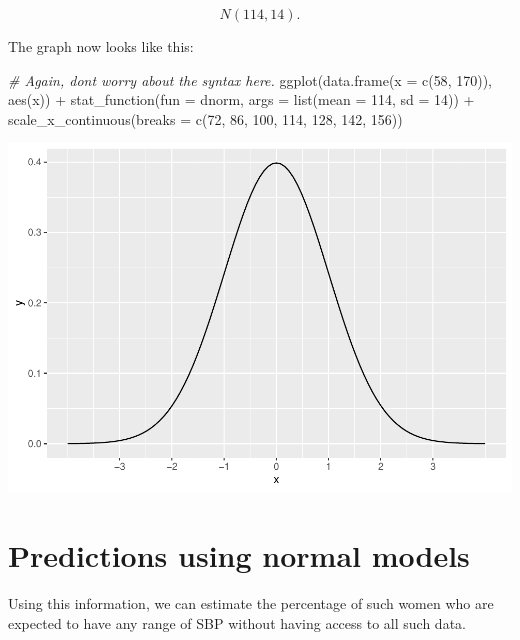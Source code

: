 \documentclass[
]{book}
\newenvironment{Shaded}{\begin{snugshade}}{\end{snugshade}}
\newcommand{\AttributeTok}[1]{\textcolor[rgb]{0.77,0.63,0.00}{#1}}
\newcommand{\CommentTok}[1]{\textcolor[rgb]{0.56,0.35,0.01}{\textit{#1}}}
\newcommand{\DecValTok}[1]{\textcolor[rgb]{0.00,0.00,0.81}{#1}}
\newcommand{\FunctionTok}[1]{\textcolor[rgb]{0.00,0.00,0.00}{#1}}
\newcommand{\NormalTok}[1]{#1}
\newcommand{\SpecialCharTok}[1]{\textcolor[rgb]{0.00,0.00,0.00}{#1}}
\begin{document}
\[
N(114, 14).
\]

The graph now looks like this:

\begin{Shaded}
\begin{Highlighting}[]
\CommentTok{\# Again, don\textquotesingle{}t worry about the syntax here.}
\FunctionTok{ggplot}\NormalTok{(}\FunctionTok{data.frame}\NormalTok{(}\AttributeTok{x =} \FunctionTok{c}\NormalTok{(}\DecValTok{58}\NormalTok{, }\DecValTok{170}\NormalTok{)), }\FunctionTok{aes}\NormalTok{(x)) }\SpecialCharTok{+}
    \FunctionTok{stat\_function}\NormalTok{(}\AttributeTok{fun =}\NormalTok{ dnorm, }\AttributeTok{args =} \FunctionTok{list}\NormalTok{(}\AttributeTok{mean =} \DecValTok{114}\NormalTok{, }\AttributeTok{sd =} \DecValTok{14}\NormalTok{)) }\SpecialCharTok{+}
    \FunctionTok{scale\_x\_continuous}\NormalTok{(}\AttributeTok{breaks =} \FunctionTok{c}\NormalTok{(}\DecValTok{72}\NormalTok{, }\DecValTok{86}\NormalTok{, }\DecValTok{100}\NormalTok{, }\DecValTok{114}\NormalTok{, }\DecValTok{128}\NormalTok{, }\DecValTok{142}\NormalTok{, }\DecValTok{156}\NormalTok{))}
\end{Highlighting}
\end{Shaded}

\includegraphics{intro_stats_files/figure-latex/unnamed-chunk-337-1.pdf}

\hypertarget{normal-predictions}{%
\section{Predictions using normal models}\label{normal-predictions}}

Using this information, we can estimate the percentage of such women who are expected to have any range of SBP without having access to all such data.
\end{document}
